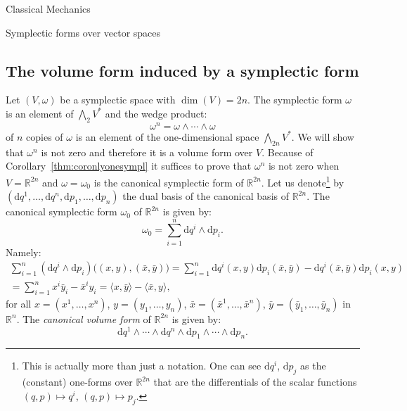 \documentclass[oneside,a4paper,11pt]{amsbook}
\newcommand{\R}{\mathds R}
\newcommand{\dd}{\mathrm d}
\DeclareMathOperator{\Dim}{dim}
\theoremstyle{remark}\newtheorem{exercise}{Exercise}[chapter]
\theoremstyle{plain}\newtheorem{teo}{Theorem}[section]
\theoremstyle{plain}\newtheorem{lem}[teo]{Lemma}
\theoremstyle{plain}\newtheorem{prop}[teo]{Proposition}
\theoremstyle{plain}\newtheorem{cor}[teo]{Corollary}
\theoremstyle{definition}\newtheorem{defin}[teo]{Definition}
\theoremstyle{remark}\newtheorem{rem}[teo]{Remark}
\theoremstyle{definition}\newtheorem{notation}[teo]{Notation}
\theoremstyle{definition}\newtheorem{convention}[teo]{Convention}
\theoremstyle{definition}\newtheorem{example}[teo]{Example}
\numberwithin{section}{chapter}
\numberwithin{equation}{section}
\begin{document}
\begin{chapter}{Classical Mechanics}
\begin{section}{Symplectic forms over vector spaces}
\subsection{The volume form induced by a symplectic form}\label{sub:symplvolume}
Let $(V,\omega)$ be a symplectic space with
$\Dim(V)=2n$. The symplectic form $\omega$ is an element of $\bigwedge_2V^*$ and the wedge product:
\[\omega^n=\omega\wedge\cdots\wedge\omega\]
of $n$ copies of $\omega$ is an element of the one-dimensional space $\bigwedge_{2n}V^*$. We will show that
$\omega^n$ is not zero and therefore it is a volume form over $V$. Because of Corollary~\ref{thm:coronlyonesympl}
it suffices to prove that $\omega^n$ is not zero when $V=\R^{2n}$ and $\omega=\omega_0$ is the canonical
symplectic form of $\R^{2n}$. Let us denote\footnote{%
This is actually more than just a notation. One can see $\dd q^i$, $\dd p_j$ as the (constant) one-forms
over $\R^{2n}$ that are the differentials of the scalar functions $(q,p)\mapsto q^i$, $(q,p)\mapsto p_j$.}
by $(\dd q^1,\ldots,\dd q^n,\dd p_1,\ldots,\dd p_n)$ the dual basis of the canonical basis of $\R^{2n}$.
The canonical symplectic form $\omega_0$ of $\R^{2n}$ is given by:
\begin{equation}\label{eq:omega0dqidpi}
\omega_0=\sum_{i=1}^n\dd q^i\wedge\dd p_i.
\end{equation}
Namely:
\begin{multline*}
\sum_{i=1}^n(\dd q^i\wedge\dd p_i)\big((x,y),(\bar x,\bar y)\big)=
\sum_{i=1}^n\dd q^i(x,y)\dd p_i(\bar x,\bar y)-\dd q^i(\bar x,\bar y)\dd p_i(x,y)\\
=\sum_{i=1}^nx^i\bar y_i-\bar x^iy_i=\langle x,\bar y\rangle-\langle\bar x,y\rangle,
\end{multline*}
for all $x=(x^1,\ldots,x^n)$, $y=(y_1,\ldots,y_n)$, $\bar x=(\bar x^1,\ldots,\bar x^n)$, $\bar y=(\bar y_1,\ldots,\bar y_n)$ in $\R^n$.
The {\em canonical volume form\/} of $\R^{2n}$ is given by:
\[\dd q^1\wedge\cdots\wedge\dd q^n\wedge\dd p_1\wedge\cdots\wedge\dd p_n.\]


\end{section}
\end{chapter}
\end{document}
